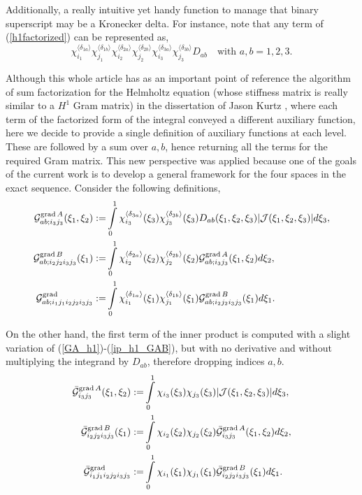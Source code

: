 Additionally, a really intuitive yet handy function to manage that binary superscript may be a Kronecker delta. For instance, note that any term of (\ref{h1factorized}) can be represented as,
% 
\begin{equation*}
    \chi_{i_1}^{\langle\delta_{1a}\rangle}\chi_{j_1}^{\langle\delta_{1b}\rangle} \chi_{i_2}^{\langle\delta_{2a}\rangle}\chi_{j_2}^{\langle\delta_{2b}\rangle}
    \chi_{i_3}^{\langle\delta_{3a}\rangle}\chi_{j_3}^{\langle\delta_{3b}\rangle} D_{ab} \quad \text{with }a,b=1,2,3.
\end{equation*}
%

Although this whole article has as an important point of reference the algorithm of sum factorization for the Helmholtz equation (whose stiffness matrix is really similar to a $H^1$ Gram matrix) in the dissertation of Jason Kurtz \cite{kurtz2007fully}, where each term of the factorized form of the integral conveyed a different auxiliary function, here we decide to provide a single definition of auxiliary functions at each level. These are followed by a sum over $a,b$, hence returning all the terms for the required Gram matrix. This new perspective was applied because one of the goals of the current work is to develop a general framework for the four spaces in the exact sequence. Consider the following definitions,
% 
\begin{align}
    \mathcal{G}_{ab;i_3j_3}^{\operatorname{grad} A}(\xi_1,\xi_2):=&\int\limits_0^1\chi_{i_3}^{\langle\delta_{3a}\rangle}(\xi_3)\chi_{j_3}^{\langle\delta_{3b}\rangle}(\xi_3) D_{ab}(\xi_1,\xi_2,\xi_3)|\mathcal{J}(\xi_1,\xi_2,\xi_3)|d\xi_3,\label{GA_h1}\\
    \mathcal{G}_{ab;i_2j_2i_3j_3}^{\operatorname{grad} B}(\xi_1):=&\int\limits_0^1\chi_{i_2}^{\langle\delta_{2a}\rangle}(\xi_2)\chi_{j_2}^{\langle\delta_{2b}\rangle}(\xi_2) \mathcal{G}_{ab;i_3j_3}^{\operatorname{grad} A}(\xi_1,\xi_2)d\xi_2,\label{GB_h1}\\
    \mathcal{G}_{ab;i_1j_1i_2j_2i_3j_3}^{\operatorname{grad}}:=&\int\limits_0^1 \chi_{i_1}^{\langle\delta_{1a}\rangle}(\xi_1)\chi_{j_1}^{\langle\delta_{1b}\rangle}(\xi_1)
    \mathcal{G}_{ab;i_2j_2i_3j_3}^{\operatorname{grad} B}(\xi_1)d\xi_1.\label{ip_h1_GAB}
\end{align}

On the other hand, the first term of the inner product is computed with a slight variation of (\ref{GA_h1})-(\ref{ip_h1_GAB}), but with no derivative and without multiplying the integrand by $D_{ab}$, therefore dropping indices $a,b$.
% 
\begin{align}
    \bar{\mathcal{G}}_{i_3j_3}^{\operatorname{grad} A}(\xi_1,\xi_2):=& \int\limits_0^1
    \chi_{i_3}(\xi_3)\chi_{j_3}(\xi_3) |\mathcal{J}(\xi_1,\xi_2,\xi_3)|d\xi_3,\label{GA0_h1}\\
    \bar{\mathcal{G}}_{i_2j_2i_3j_3}^{\operatorname{grad} B}(\xi_1):=& \int\limits_0^1
    \chi_{i_2}(\xi_2)\chi_{j_2}(\xi_2) \bar{\mathcal{G}}_{i_3j_3}^{\operatorname{grad} A} (\xi_1,\xi_2)d\xi_2,\label{GB0_h1}\\
    \bar{\mathcal{G}}_{i_1j_1i_2j_2i_3j_3}^{\operatorname{grad}}:=&\int\limits_0^1 
    \chi_{i_1}(\xi_1)\chi_{j_1}(\xi_1)\bar{\mathcal{G}}_{i_2j_2i_3j_3}^{\operatorname{grad} B}(\xi_1) d\xi_1.\label{ip_h1_GAB0}
\end{align}

